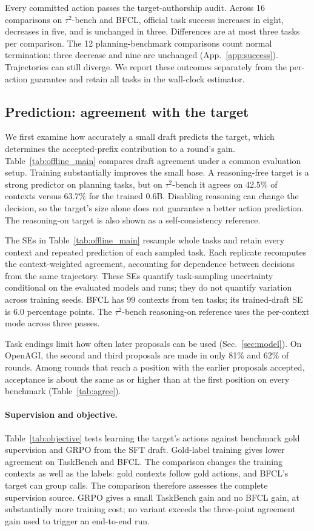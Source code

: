 Every committed action passes the target-authorship audit. Across 16 comparisons on $\tau^2$-bench
and BFCL, official task success increases in eight, decreases in five, and is unchanged in three.
Differences are at most three tasks per comparison. The 12 planning-benchmark comparisons count
normal termination: three decrease and nine are unchanged (App.~\ref{app:success}). Trajectories
can still diverge. We report these outcomes separately from the per-action guarantee and retain
all tasks in the wall-clock estimator.

\subsection{Prediction: agreement with the target}
\label{sec:agreement}
We first examine how accurately a small draft predicts the target, which determines the
accepted-prefix contribution to a round's gain.
Table~\ref{tab:offline_main} compares draft agreement under a common evaluation setup. Training
substantially improves the small base. A reasoning-free target is a strong predictor on planning
tasks, but on $\tau^2$-bench it agrees on 42.5\% of contexts versus 63.7\% for the trained 0.6B.
Disabling reasoning can change the decision, so the target's size alone does not guarantee a better
action prediction. The reasoning-on target is also shown as a self-consistency reference.



The SEs in Table~\ref{tab:offline_main} resample whole tasks and retain every context and repeated
prediction of each sampled task. Each replicate recomputes the context-weighted agreement, accounting
for dependence between decisions from the same trajectory. These SEs quantify task-sampling uncertainty
conditional on the evaluated models and runs; they do not quantify variation across training seeds.
BFCL has 99 contexts from ten tasks; its trained-draft SE is 6.0 percentage points. The $\tau^2$-bench
reasoning-on reference uses the per-context mode across three passes.

Task endings limit how often later proposals can be used (Sec.~\ref{sec:model}).
On OpenAGI, the second and third proposals are made in only 81\% and 62\% of rounds.
Among rounds that reach a position with the earlier proposals accepted, acceptance is about the
same as or higher than at the first position on every benchmark (Table~\ref{tab:agree}).

\paragraph{Supervision and objective.}
Table~\ref{tab:objective} tests learning the target's actions against benchmark gold supervision and
GRPO from the SFT draft. Gold-label training gives lower agreement on TaskBench and BFCL. The
comparison changes the training contexts as well as the labels: gold contexts follow gold actions,
and BFCL's target can group calls. The comparison therefore assesses the complete supervision source.
GRPO gives a small TaskBench gain and no BFCL gain, at substantially more
training cost; no variant exceeds the three-point agreement gain used to trigger an end-to-end run.

